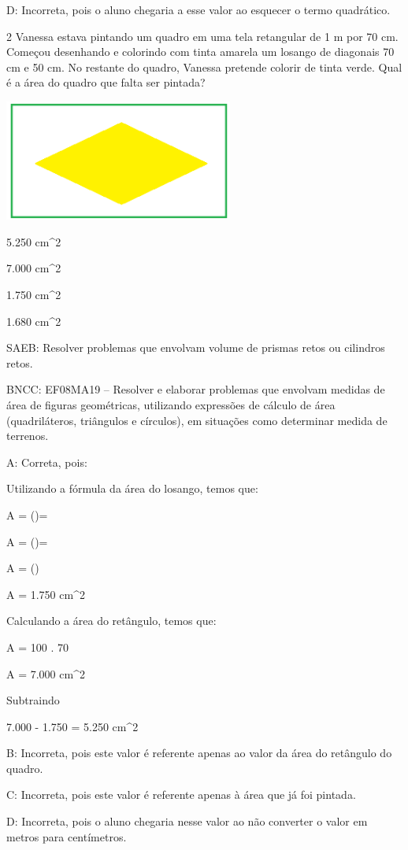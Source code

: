{D: Incorreta, pois o aluno chegaria a esse valor ao esquecer o termo
quadrático.

\num{2} Vanessa estava pintando um quadro em uma tela retangular de 1 m por
70 cm. Começou desenhando e colorindo com tinta amarela um losango de
diagonais 70 cm e 50 cm. No restante do quadro, Vanessa pretende colorir
de tinta verde. Qual é a área do quadro que falta ser pintada?

\includegraphics[width=2.95833in,height=1.56526in]{./imgSAEB_8_MAT/media/image54.png}
\item 5.250 cm^2
\item 7.000 cm^2
\item 1.750 cm^2
\item 1.680 cm^2

SAEB: Resolver problemas que envolvam volume de prismas retos ou
cilindros retos.

BNCC: EF08MA19 -- Resolver e elaborar problemas que envolvam medidas de
área de figuras geométricas, utilizando expressões de cálculo de área
(quadriláteros, triângulos e círculos), em situações como determinar
medida de terrenos.

A: Correta, pois:

Utilizando a fórmula da área do losango, temos que:

A = ()=

A = ()=

A = ()

A = 1.750 cm^2

Calculando a área do retângulo, temos que:

A = 100 . 70

A = 7.000 cm^2

Subtraindo

7.000 - 1.750 = 5.250 cm^2

B: Incorreta, pois este valor é referente apenas ao valor da área do
retângulo do quadro.

C: Incorreta, pois este valor é referente apenas à área que já foi
pintada.

D: Incorreta, pois o aluno chegaria nesse valor ao não converter o valor
em metros para centímetros.

}
